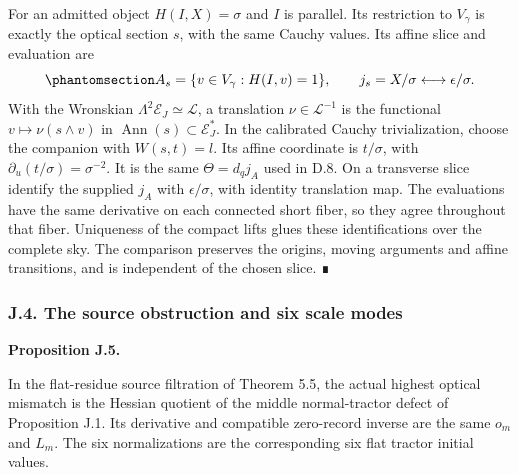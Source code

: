 \documentclass[
  english,
  11pt,
  reqno]{amsart}
\makeatletter
\newcommand{\pandocstatementheading}[1]{%
  \par\addpenalty{\@beginparpenalty}%
  \addvspace{.5\baselineskip plus .2\baselineskip minus .2\baselineskip}%
  {\normalfont\bfseries #1\par}%
  \nobreak\@afterindenttrue\@afterheading
}
\makeatother
\begin{document}
For an admitted object \(H(I,X)=\sigma\) and \(I\) is parallel. Its
restriction to \(V_\gamma\) is exactly the optical section \(s\), with
the same Cauchy values. Its affine slice and evaluation are
\begin{equation}\protect\phantomsection\label{eq:gg-same-infinity-affine-slice}{
 A_s=\{v\in V_\gamma:H(I,v)=1\},\qquad
 j_s=X/\sigma\longleftrightarrow\epsilon/\sigma.
}\end{equation} With the Wronskian
\(\Lambda^2\mathcal E_J\simeq\mathcal L\), a translation
\(\nu\in\mathcal L^{-1}\) is the functional \(v\mapsto\nu(s\wedge v)\)
in \(\operatorname{Ann}(s)\subset\mathcal E_J^*\). In the calibrated
Cauchy trivialization, choose the companion with \(W(s,t)=l\). Its
affine coordinate is \(t/\sigma\), with
\(\partial_u(t/\sigma)=\sigma^{-2}\). It is the same \(\Theta=d_qj_A\)
used in D.8. On a transverse slice identify the supplied \(j_A\) with
\(\epsilon/\sigma\), with identity translation map. The evaluations have
the same derivative on each connected short fiber, so they agree
throughout that fiber. Uniqueness of the compact lifts glues these
identifications over the complete sky. The comparison preserves the
origins, moving arguments and affine transitions, and is independent of
the chosen slice. ∎

\protect{}\label{sec:gg-source-ward-defect}

\subsubsection{J.4. The source obstruction and six scale
modes}\label{j.4.-the-source-obstruction-and-six-scale-modes}

\pandocstatementheading{\protect{}\label{prop:gg-source-ward-defect}Proposition J.5.}

In the flat-residue source filtration of Theorem 5.5, the actual highest
optical mismatch is the Hessian quotient of the middle normal-tractor
defect of Proposition J.1. Its derivative and compatible zero-record
inverse are the same \(o_m\) and \(L_m\). The six normalizations are the
corresponding six flat tractor initial values.
\end{document}
